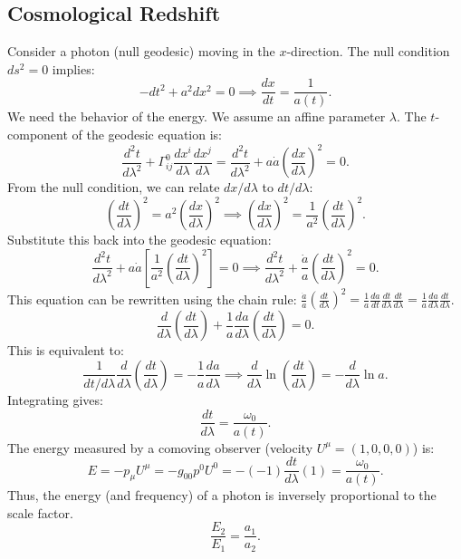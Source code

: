 \documentclass[11pt, a4paper]{report}
\begin{document}
\subsection*{Cosmological Redshift}
Consider a photon (null geodesic) moving in the \(x\)-direction. The null condition \(ds^2=0\) implies:
\begin{equation}
-dt^2 + a^2 dx^2 = 0 \implies \frac{dx}{dt} = \frac{1}{a(t)}.
\end{equation}
We need the behavior of the energy. We assume an affine parameter \(\lambda\). The \(t\)-component of the geodesic equation is:
\begin{equation}
\frac{d^2 t}{d\lambda^2} + \Gamma^0_{ij} \frac{dx^i}{d\lambda} \frac{dx^j}{d\lambda} = \frac{d^2 t}{d\lambda^2} + a\dot{a} \left(\frac{dx}{d\lambda}\right)^2 = 0.
\end{equation}
From the null condition, we can relate \(dx/d\lambda\) to \(dt/d\lambda\):
\begin{equation}
\left(\frac{dt}{d\lambda}\right)^2 = a^2 \left(\frac{dx}{d\lambda}\right)^2 \implies \left(\frac{dx}{d\lambda}\right)^2 = \frac{1}{a^2} \left(\frac{dt}{d\lambda}\right)^2.
\end{equation}
Substitute this back into the geodesic equation:
\begin{equation}
\frac{d^2 t}{d\lambda^2} + a\dot{a} \left[ \frac{1}{a^2} \left(\frac{dt}{d\lambda}\right)^2 \right] = 0 \implies \frac{d^2 t}{d\lambda^2} + \frac{\dot{a}}{a} \left(\frac{dt}{d\lambda}\right)^2 = 0.
\end{equation}
This equation can be rewritten using the chain rule: \(\frac{\dot{a}}{a} (\frac{dt}{d\lambda})^2 = \frac{1}{a} \frac{da}{dt} \frac{dt}{d\lambda} \frac{dt}{d\lambda} = \frac{1}{a} \frac{da}{d\lambda} \frac{dt}{d\lambda}\).
\begin{equation}
\frac{d}{d\lambda} \left( \frac{dt}{d\lambda} \right) + \frac{1}{a} \frac{da}{d\lambda} \left( \frac{dt}{d\lambda} \right) = 0.
\end{equation}
This is equivalent to:
\begin{equation}
\frac{1}{dt/d\lambda} \frac{d}{d\lambda} \left( \frac{dt}{d\lambda} \right) = - \frac{1}{a} \frac{da}{d\lambda} \implies \frac{d}{d\lambda} \ln \left( \frac{dt}{d\lambda} \right) = - \frac{d}{d\lambda} \ln a.
\end{equation}
Integrating gives:
\begin{equation}
\frac{dt}{d\lambda} = \frac{\omega_0}{a(t)}.
\end{equation}
The energy measured by a comoving observer (velocity \(U^\mu = (1, 0, 0, 0)\)) is:
\begin{equation}
E = -p_\mu U^\mu = -g_{00} p^0 U^0 = -(-1) \frac{dt}{d\lambda} (1) = \frac{\omega_0}{a(t)}.
\end{equation}
Thus, the energy (and frequency) of a photon is inversely proportional to the scale factor.
\begin{equation}
\frac{E_2}{E_1} = \frac{a_1}{a_2}.
\end{equation}
\end{document}
